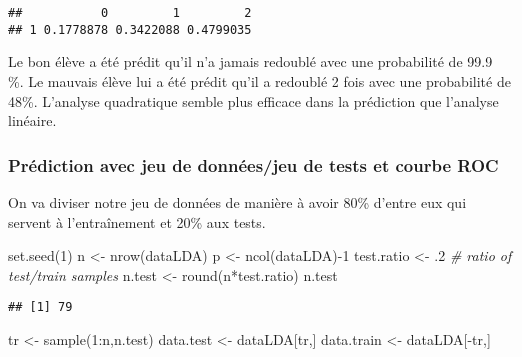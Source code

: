 \documentclass[
]{article}
\newenvironment{Shaded}{\begin{snugshade}}{\end{snugshade}}
\newcommand{\CommentTok}[1]{\textcolor[rgb]{0.56,0.35,0.01}{\textit{#1}}}
\newcommand{\DecValTok}[1]{\textcolor[rgb]{0.00,0.00,0.81}{#1}}
\newcommand{\FunctionTok}[1]{\textcolor[rgb]{0.00,0.00,0.00}{#1}}
\newcommand{\NormalTok}[1]{#1}
\newcommand{\OtherTok}[1]{\textcolor[rgb]{0.56,0.35,0.01}{#1}}
\newcommand{\SpecialCharTok}[1]{\textcolor[rgb]{0.00,0.00,0.00}{#1}}
\begin{document}
\begin{verbatim}
##           0         1         2
## 1 0.1778878 0.3422088 0.4799035
\end{verbatim}

Le bon élève a été prédit qu'il n'a jamais redoublé avec une probabilité
de 99.9 \%. Le mauvais élève lui a été prédit qu'il a redoublé 2 fois
avec une probabilité de 48\%. L'analyse quadratique semble plus efficace
dans la prédiction que l'analyse linéaire.

\hypertarget{pruxe9diction-avec-jeu-de-donnuxe9esjeu-de-tests-et-courbe-roc}{%
\subsubsection{Prédiction avec jeu de données/jeu de tests et courbe
ROC}\label{pruxe9diction-avec-jeu-de-donnuxe9esjeu-de-tests-et-courbe-roc}}

On va diviser notre jeu de données de manière à avoir 80\% d'entre eux
qui servent à l'entraînement et 20\% aux tests.

\begin{Shaded}
\begin{Highlighting}[]
\FunctionTok{set.seed}\NormalTok{(}\DecValTok{1}\NormalTok{)}
\NormalTok{n }\OtherTok{\textless{}{-}} \FunctionTok{nrow}\NormalTok{(dataLDA)}
\NormalTok{p }\OtherTok{\textless{}{-}} \FunctionTok{ncol}\NormalTok{(dataLDA)}\SpecialCharTok{{-}}\DecValTok{1}
\NormalTok{test.ratio }\OtherTok{\textless{}{-}}\NormalTok{ .}\DecValTok{2} \CommentTok{\# ratio of test/train samples}
\NormalTok{n.test }\OtherTok{\textless{}{-}} \FunctionTok{round}\NormalTok{(n}\SpecialCharTok{*}\NormalTok{test.ratio)}
\NormalTok{n.test}
\end{Highlighting}
\end{Shaded}

\begin{verbatim}
## [1] 79
\end{verbatim}

\begin{Shaded}
\begin{Highlighting}[]
\NormalTok{tr }\OtherTok{\textless{}{-}} \FunctionTok{sample}\NormalTok{(}\DecValTok{1}\SpecialCharTok{:}\NormalTok{n,n.test)}
\NormalTok{data.test }\OtherTok{\textless{}{-}}\NormalTok{ dataLDA[tr,]}
\NormalTok{data.train }\OtherTok{\textless{}{-}}\NormalTok{ dataLDA[}\SpecialCharTok{{-}}\NormalTok{tr,]}
\end{Highlighting}
\end{Shaded}
\end{document}
